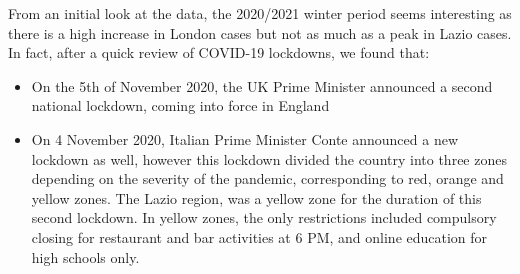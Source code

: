 \documentclass[
  letterpaper,
  DIV=11,
  numbers=noendperiod]{scrreprt}
\providecommand{\tightlist}{%
  \setlength{\itemsep}{0pt}\setlength{\parskip}{0pt}}\usepackage{longtable,booktabs,array}
\begin{document}
From an initial look at the data, the 2020/2021 winter period seems
interesting as there is a high increase in London cases but not as much
as a peak in Lazio cases. In fact, after a quick review of COVID-19
lockdowns, we found that:

\begin{itemize}
\tightlist
\item
  On the 5th of November 2020, the UK Prime Minister announced a second
  national lockdown, coming into force in England
\item
  On 4 November 2020, Italian Prime Minister Conte announced a new
  lockdown as well, however this lockdown divided the country into three
  zones depending on the severity of the pandemic, corresponding to red,
  orange and yellow zones. The Lazio region, was a yellow zone for the
  duration of this second lockdown. In yellow zones, the only
  restrictions included compulsory closing for restaurant and bar
  activities at 6 PM, and online education for high schools only.
\end{itemize}
\end{document}
